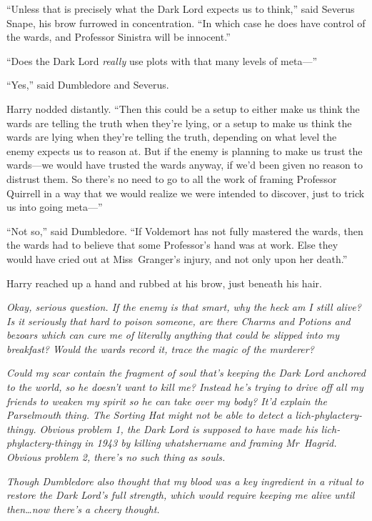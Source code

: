 “Unless that is precisely what the Dark Lord expects us to think,” said Severus Snape, his brow furrowed in concentration. “In which case he does have control of the wards, and Professor Sinistra will be innocent.”

“Does the Dark Lord \emph{really} use plots with that many levels of meta—”

“Yes,” said Dumbledore and Severus.

Harry nodded distantly. “Then this could be a setup to either make us think the wards are telling the truth when they’re lying, or a setup to make us think the wards are lying when they’re telling the truth, depending on what level the enemy expects us to reason at. But if the enemy is planning to make us trust the wards—we would have trusted the wards anyway, if we’d been given no reason to distrust them. So there’s no need to go to all the work of framing Professor Quirrell in a way that we would realize we were intended to discover, just to trick us into going meta—”

“Not so,” said Dumbledore. “If Voldemort has not fully mastered the wards, then the wards had to believe that some Professor’s hand was at work. Else they would have cried out at Miss~Granger’s injury, and not only upon her death.”

Harry reached up a hand and rubbed at his brow, just beneath his hair.

\emph{Okay, serious question. If the enemy is that smart, why the heck am I still alive? Is it seriously that hard to poison someone, are there Charms and Potions and bezoars which can cure me of literally anything that could be slipped into my breakfast? Would the wards record it, trace the magic of the murderer?}

\emph{Could my \emph{scar} contain the fragment of soul that’s keeping the Dark Lord anchored to the world, so he doesn’t want to kill me? Instead he’s trying to drive off all my friends to weaken my spirit so he can take over my body? It’d explain the Parselmouth thing. The Sorting Hat might not be able to detect a lich-phylactery-thingy. Obvious problem 1, the Dark Lord is supposed to have made his lich-phylactery-thingy in 1943 by killing whatshername and framing Mr~Hagrid. Obvious problem 2, there’s no such thing as souls.}

\emph{Though Dumbledore also thought that my blood was a key ingredient in a ritual to restore the Dark Lord’s full strength, which would require keeping me alive until then…now there’s a cheery thought.}

